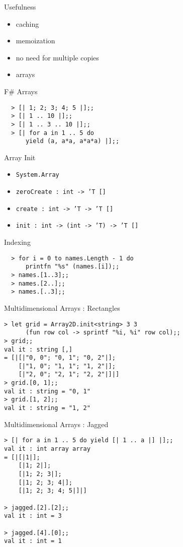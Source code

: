 \documentclass{beamer}
\begin{document}
\begin{frame}{Usefulness}
  \begin{itemize}[<+->]
    \item caching
    \item memoization
    \item no need for multiple copies
    \item arrays
  \end{itemize}
\end{frame}

\begin{frame}[fragile]{F\# Arrays}
  \begin{verbatim}
  > [| 1; 2; 3; 4; 5 |];;
  > [| 1 .. 10 |];;
  > [| 1 .. 3 .. 10 |];;
  > [| for a in 1 .. 5 do
      yield (a, a*a, a*a*a) |];;
  \end{verbatim}
\end{frame}

\begin{frame}{Array Init}
  \begin{itemize}[<+->]
    \item \texttt{System.Array}
    \item \texttt{zeroCreate : int -> 'T []}
    \item \texttt{create : int -> 'T -> 'T []}
    \item \texttt{init : int -> (int -> 'T) -> 'T []}
  \end{itemize}
\end{frame}

\begin{frame}[fragile]{Indexing}
  \begin{verbatim}
  > for i = 0 to names.Length - 1 do
      printfn "%s" (names.[i]);;
  > names.[1..3];;
  > names.[2..];;
  > names.[..3];;
  \end{verbatim}
\end{frame}

\begin{frame}[fragile]{Multidimensional Arrays : Rectangles}
\small
  \begin{verbatim}
> let grid = Array2D.init<string> 3 3
      (fun row col -> sprintf "%i, %i" row col);;
> grid;;
val it : string [,]
= [|[|"0, 0"; "0, 1"; "0, 2"|];
    [|"1, 0"; "1, 1"; "1, 2"|];
    [|"2, 0"; "2, 1"; "2, 2"|]|]
> grid.[0, 1];;
val it : string = "0, 1"
> grid.[1, 2];;
val it : string = "1, 2"
  \end{verbatim}
\end{frame}

\begin{frame}[fragile]{Multidimensional Arrays : Jagged}
  \begin{verbatim}
> [| for a in 1 .. 5 do yield [| 1 .. a |] |];;
val it : int array array
= [|[|1|];
    [|1; 2|];
    [|1; 2; 3|];
    [|1; 2; 3; 4|];
    [|1; 2; 3; 4; 5|]|]

> jagged.[2].[2];;
val it : int = 3

> jagged.[4].[0];;
val it : int = 1
  \end{verbatim}
\end{frame}
\end{document}

